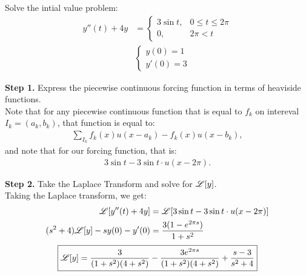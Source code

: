 \documentclass[11pt]{article}
\begin{document}
    \newpage 
    \begin{problem}
        Solve the intial value problem:
        \begin{align}
            y''(t) + 4y &= 
            \begin{cases}
            3\sin t, &0\le t \le 2\pi \\ 
            0, &2\pi<t   \end{cases} \\
            &\begin{cases}
                y(0) = 1 \\
                y'(0) = 3
            \end{cases}
        \end{align}
    \end{problem}
    \begin{solution}
        \textbf{Step 1.} Express the piecewise continuous forcing function in terms of heaviside functions. \\
        Note that for any piecewise continuous function that is equal to $f_k$ on intereval $I_k = (a_k,b_k)$, that function is equal to:
        \begin{align}
            \sum_{I_k} f_k(x)u(x-a_k) - f_k(x)u(x-b_k),
        \end{align}
        and note that for our forcing function, that is:
        \begin{align}
            \boxed{3\sin t - 3\sin t \cdot u(x-2\pi).}
        \end{align}
    \end{solution}
    \begin{solution}
        \textbf{Step 2.} Take the Laplace Transform and solve for $\mathscr L[y]$. \\
        Taking the Laplace transform, we get:
        \begin{align}
            \mathscr L[y''(t) + 4y] &= \mathscr L[3\sin t - 3\sin t \cdot u(x-2\pi)] \\
            (s^2+4)\mathscr L[y] - sy(0)-y'(0) &= \dfrac{3(1-e^{2\pi s})}{1+s^2}
        \end{align}
        \begin{align}
            \boxed{\mathscr L[y] = \dfrac{3}{(1+s^2)(4+s^2)} - \dfrac{3e^{2\pi s}}{(1+s^2)(4+s^2)}+ \dfrac{s-3}{s^2+4}}
        \end{align}
    \end{solution}
    \newpage
\end{document}
